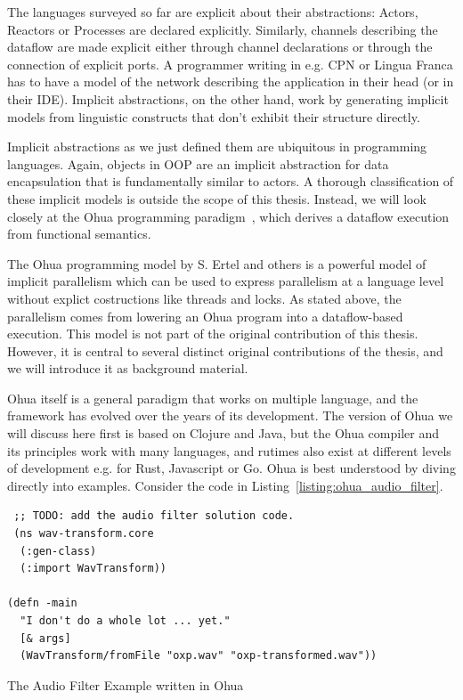 The languages surveyed so far are explicit about their abstractions: Actors, Reactors or Processes are declared explicitly.
Similarly, channels describing the dataflow are made explicit either through channel declarations or through the connection of explicit ports.
A programmer writing in e.g. \ac{CPN} or Lingua Franca has to have a model of the network describing the application in their head (or in their \acs{IDE}).
Implicit abstractions, on the other hand, work by generating implicit models from linguistic constructs that don't exhibit their structure directly.

Implicit abstractions as we just defined them are ubiquitous in programming languages.
Again, objects in \ac{OOP} are an implicit abstraction for data encapsulation that is fundamentally similar to actors.
A thorough classification  of these implicit models is outside the scope of this thesis.
Instead, we will look closely at the Ohua programming paradigm~\cite{ertel_phdthesis}, which derives a dataflow execution from functional semantics.

The Ohua programming model by S. Ertel and others is a powerful model of implicit parallelism which can be used to express parallelism at a language level without explict costructions like threads and locks. 
As stated above, the parallelism comes from lowering an Ohua program into a dataflow-based execution.
This model is not part of the original contribution of this thesis.
However, it is central to several distinct original contributions of the thesis, and we will introduce it as background material.

Ohua itself is a general paradigm that works on multiple language, and the framework has evolved over the years of its development.
The version of Ohua we will discuss here first is based on Clojure and Java, but the Ohua compiler and its principles work with many languages,
and rutimes also exist at different levels of development e.g. for Rust, Javascript or Go.
Ohua is best understood by diving directly into examples. Consider the code in Listing~\ref{listing:ohua_audio_filter}.

\begin{listing}
\begin{verbatim}
 ;; TODO: add the audio filter solution code.
 (ns wav-transform.core
  (:gen-class)
  (:import WavTransform))

(defn -main
  "I don't do a whole lot ... yet."
  [& args]
  (WavTransform/fromFile "oxp.wav" "oxp-transformed.wav")) 
\end{verbatim}
\caption{The Audio Filter Example written in Ohua}
\label{listing:ohua_audio_filter}
\end{listing}

